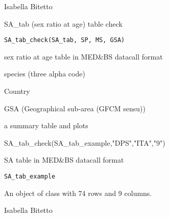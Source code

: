 \documentclass[a4paper]{book}
\begin{document}
%
\begin{Author}\relax
Isabella Bitetto 
\end{Author}
%
\begin{Description}\relax
SA\_tab (sex ratio at age) table check
\end{Description}
%
\begin{Usage}
\begin{verbatim}
SA_tab_check(SA_tab, SP, MS, GSA)
\end{verbatim}
\end{Usage}
%
\begin{Arguments}
\begin{ldescription}
\item[\code{SA\_tab}] sex ratio at age table in MED\&BS datacall format

\item[\code{SP}] species (three alpha code)

\item[\code{MS}] Country

\item[\code{GSA}] GSA (Geographical sub-area (GFCM sensu))
\end{ldescription}
\end{Arguments}
%
\begin{Value}
a summary table and plots
\end{Value}
%
\begin{Examples}
\begin{ExampleCode}
SA_tab_check(SA_tab_example,"DPS","ITA","9")
\end{ExampleCode}
\end{Examples}
%
\begin{Description}\relax
SA table in MED\&BS datacall format
\end{Description}
%
\begin{Usage}
\begin{verbatim}
SA_tab_example
\end{verbatim}
\end{Usage}
%
\begin{Format}
An object of class  with 74 rows and 9 columns.
\end{Format}
%
\begin{Author}\relax
Isabella Bitetto 
\end{Author}
\end{document}
